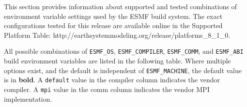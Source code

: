 

This section provides information about supported and tested 
combinations of environment variable settings used by the ESMF
build system. The exact configurations tested for this release
 are available online in the Supported Platform Table:
{http://earthsystemmodeling.org/release/platforms_8_1_0}.

All possible combinations of {\tt ESMF\_OS}, {\tt ESMF\_COMPILER}, {\tt ESMF\_COMM},
and {\tt ESMF\_ABI} build environment variables are listed in the following table.
Where multiple options exist, and the default is independent
of {\tt ESMF\_MACHINE}, the default value is in {\bf bold}.
A {\tt default} value in the compiler column indicates
the vendor compiler. A {\tt mpi} value in the comm column indicates
the vendor MPI implementation.

